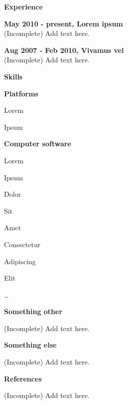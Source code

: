 \documentclass[a4paper,12pt,final]{memoir}
\newcommand{\Sep}{\vspace{1.5em}}
\newcommand{\SmallSep}{\vspace{0.5em}}
\newcommand{\CVSection}[1]
	{\Large\textbf{#1}\par
	\SmallSep\normalsize\normalfont}
\newcommand{\CVItem}[1]
	{\textbf{\color{RoyalBlue} #1}}
\begin{document}
\CVSection{Experience}
\CVItem{May 2010 - present, Lorem ipsum}\\
(Incomplete) Add text here.
\SmallSep

\CVItem{Aug 2007 - Feb 2010, Vivamus vel}\\
(Incomplete) Add text here.
\Sep

\CVSection{Skills}
\CVItem{Platforms}
\begin{multicols}{3}
\begin{compactitem}[\color{RoyalBlue}$\circ$]
	\item Lorem 
	\item Ipsum 
\end{compactitem}
\end{multicols}
\SmallSep

\CVItem{Computer software}
\begin{multicols}{3}
\begin{compactitem}[\color{RoyalBlue}$\circ$]
	\item Lorem 
	\item Ipsum 
	\item Dolor 
	\item Sit 
	\item Amet
	\item Consectetur 
	\item Adipiscing 
	\item Elit
	\item \ldots
\end{compactitem}
\end{multicols}
\Sep 

\CVSection{Something other}
(Incomplete) Add text here.

\clearpage
\framebreak
\framebreak

\CVSection{Something else}
(Incomplete) Add text here.
\Sep

\CVSection{References}
(Incomplete) Add text here.

\end{document}
